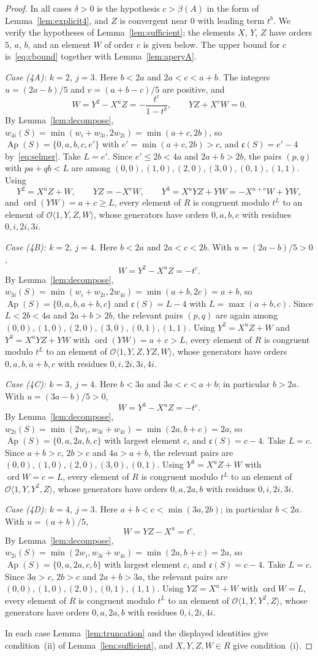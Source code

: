 \documentclass{amsart}
\theoremstyle{definition}
\theoremstyle{remark}
\numberwithin{equation}{section}
\newcommand{\cO}{\mathcal{O}}
\newcommand{\Ap}{\operatorname{Ap}}
\newcommand{\ord}{\operatorname{ord}}
\newcommand{\cond}{\mathfrak{c}}
\newcommand{\Os}[1]{\cO\langle #1\rangle}
\begin{document}
\begin{proof}
In all cases $\delta>0$ is the hypothesis $c>\beta(A)$ in the form of Lemma~\ref{lem:explicit4}, and $Z$ is convergent near $0$ with leading term $t^b$. We verify the hypotheses of Lemma~\ref{lem:sufficient}; the elements $X$, $Y$, $Z$ have orders $5$, $a$, $b$, and an element $W$ of order $c$ is given below. The upper bound for $c$ is~\eqref{eq:cbound} together with Lemma~\ref{lem:aperyA}.

\emph{Case \textup{(4A)}: $k=2$, $j=3$.} Here $b<2a$ and $2a<c<a+b$. The integers $u=(2a-b)/5$ and $v=(a+b-c)/5$ are positive, and
\[
W=Y^2-X^uZ=-\frac{t^c}{1-t^\delta},\qquad YZ+X^vW=0.
\]
By Lemma~\ref{lem:decompose}, $w_{4i}(S)=\min(w_i+w_{3i},2w_{2i})=\min(a+c,2b)$, so $\Ap(S)=\{0,a,b,c,e'\}$ with $e'=\min(a+c,2b)>c$, and $\cond(S)=e'-4$ by~\eqref{eq:selmer}. Take $L=e'$. Since $e'\le2b<4a$ and $2a+b>2b$, the pairs $(p,q)$ with $pa+qb<L$ are among $(0,0),(1,0),(2,0),(3,0),(0,1),(1,1)$. Using
\[
Y^2=X^uZ+W,\qquad YZ=-X^vW,\qquad Y^3=X^uYZ+YW=-X^{u+v}W+YW,
\]
and $\ord(YW)=a+c\ge L$, every element of $R$ is congruent modulo $t^L$ to an element of $\Os{1,Y,Z,W}$, whose generators have orders $0,a,b,c$ with residues $0,i,2i,3i$.

\emph{Case \textup{(4B)}: $k=2$, $j=4$.} Here $b<2a$ and $2a<c<2b$. With $u=(2a-b)/5>0$,
\[
W=Y^2-X^uZ=-t^c.
\]
By Lemma~\ref{lem:decompose}, $w_{3i}(S)=\min(w_i+w_{2i},2w_{4i})=\min(a+b,2c)=a+b$, so $\Ap(S)=\{0,a,b,a+b,c\}$ and $\cond(S)=L-4$ with $L=\max(a+b,c)$. Since $L<2b<4a$ and $2a+b>2b$, the relevant pairs $(p,q)$ are again among $(0,0),(1,0),(2,0),(3,0),(0,1),(1,1)$. Using $Y^2=X^uZ+W$ and $Y^3=X^uYZ+YW$ with $\ord(YW)=a+c>L$, every element of $R$ is congruent modulo $t^L$ to an element of $\Os{1,Y,Z,YZ,W}$, whose generators have orders $0,a,b,a+b,c$ with residues $0,i,2i,3i,4i$.

\emph{Case \textup{(4C)}: $k=3$, $j=4$.} Here $b<3a$ and $3a<c<a+b$; in particular $b>2a$. With $u=(3a-b)/5>0$,
\[
W=Y^3-X^uZ=-t^c.
\]
By Lemma~\ref{lem:decompose}, $w_{2i}(S)=\min(2w_i,w_{3i}+w_{4i})=\min(2a,b+c)=2a$, so $\Ap(S)=\{0,a,2a,b,c\}$ with largest element $c$, and $\cond(S)=c-4$. Take $L=c$. Since $a+b>c$, $2b>c$ and $4a>a+b$, the relevant pairs are $(0,0),(1,0),(2,0),(3,0),(0,1)$. Using $Y^3=X^uZ+W$ with $\ord W=c=L$, every element of $R$ is congruent modulo $t^L$ to an element of $\Os{1,Y,Y^2,Z}$, whose generators have orders $0,a,2a,b$ with residues $0,i,2i,3i$.

\emph{Case \textup{(4D)}: $k=4$, $j=3$.} Here $a+b<c<\min(3a,2b)$; in particular $b<2a$. With $u=(a+b)/5$,
\[
W=YZ-X^u=t^c.
\]
By Lemma~\ref{lem:decompose}, $w_{2i}(S)=\min(2w_i,w_{3i}+w_{4i})=\min(2a,b+c)=2a$, so $\Ap(S)=\{0,a,2a,c,b\}$ with largest element $c$, and $\cond(S)=c-4$. Take $L=c$. Since $3a>c$, $2b>c$ and $2a+b>3a$, the relevant pairs are $(0,0),(1,0),(2,0),(0,1),(1,1)$. Using $YZ=X^u+W$ with $\ord W=L$, every element of $R$ is congruent modulo $t^L$ to an element of $\Os{1,Y,Y^2,Z}$, whose generators have orders $0,a,2a,b$ with residues $0,i,2i,4i$.

In each case Lemma~\ref{lem:truncation} and the displayed identities give condition~(ii) of Lemma~\ref{lem:sufficient}, and $X,Y,Z,W\in R$ give condition~(i).
\end{proof}
\end{document}
